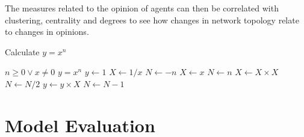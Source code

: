 \documentclass{article}
\begin{document}
The measures related to the opinion of agents can then be correlated with clustering, centrality and degrees to see how changes in network topology relate to changes in opinions. 

\begin{algorithm}
    \caption{Calculate $y = x^n$}
    \begin{algorithmic} 
    \REQUIRE $n \geq 0 \vee x \neq 0$
    \ENSURE $y = x^n$
    \STATE $y \leftarrow 1$
    \STATE $X \leftarrow 1 / x$
    \STATE $N \leftarrow -n$
    \ELSE
    \STATE $X \leftarrow x$
    \STATE $N \leftarrow n$
    \ENDIF
    \STATE $X \leftarrow X \times X$
    \STATE $N \leftarrow N / 2$
    \ELSE[$N$ is odd]
    \STATE $y \leftarrow y \times X$
    \STATE $N \leftarrow N - 1$
    \ENDIF
    \ENDWHILE
    \end{algorithmic}
    \end{algorithm}

\section{Model Evaluation}
\end{document}
